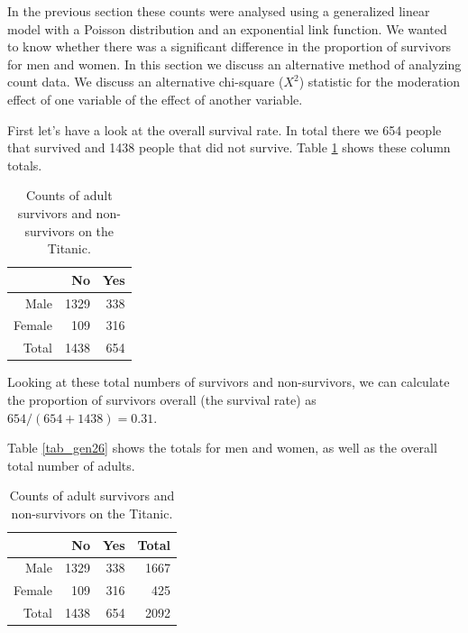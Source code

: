 \documentclass[]{report}\usepackage[]{graphicx}\usepackage[]{color}
\begin{document}
In the previous section these counts were analysed using a generalized linear model with a Poisson distribution and an exponential link function. We wanted to know whether there was a significant difference in the proportion of survivors for men and women. In this section we discuss an alternative method of analyzing count data. We discuss an alternative chi-square ($X^2$) statistic for the moderation effect of one variable of the effect of another variable.

First let's have a look at the overall survival rate. In total there we  654 people that survived and 1438 people that did not survive. Table \ref{tab:gen_25} shows these column totals.

\begin{table}[ht]
\centering
\caption{Counts of adult survivors and non-survivors on the Titanic.} 
\label{tab:gen_25}
\begin{tabular}{rrr}
  & No & Yes \\ 
  \hline
Male & 1329 & 338 \\ 
  Female & 109 & 316 \\ 
   \hline
Total & 1438 & 654 \\ 
   \hline
\end{tabular}
\end{table}


Looking at these total numbers of survivors and non-survivors, we can calculate the proportion of survivors overall (the survival rate) as $654/(654+1438)= 0.31$.

Table \ref{tab_gen26} shows the totals for men and women, as well as the overall total number of adults.


\begin{table}[ht]
\centering
\caption{Counts of adult survivors and non-survivors on the Titanic.} 
\label{tab:gen_26}
\begin{tabular}{rrrr}
  & No & Yes & Total \\ 
  \hline
Male & 1329 & 338 & 1667 \\ 
  Female & 109 & 316 & 425 \\ 
   \hline
Total & 1438 & 654 & 2092 \\ 
   \hline
\end{tabular}
\end{table}
\end{document}

